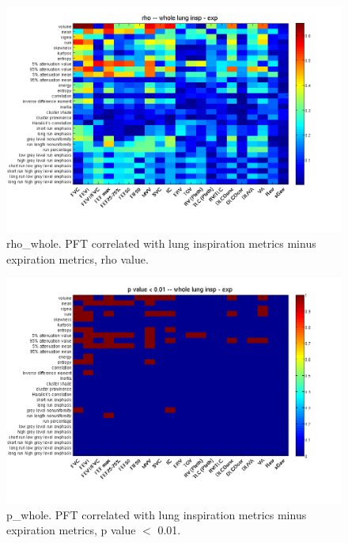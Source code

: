 \documentclass[12pt]{article}
\begin{document}
\begin{figure}
 \includegraphics[width=0.9\linewidth,viewport=100 60 620 520]{rho_whole.png}
 \caption{rho\_whole. PFT correlated with lung inspiration metrics minus expiration metrics, rho value.}
\end{figure}

\begin{figure}
 \includegraphics[width=0.9\linewidth,viewport=100 60 620 520]{p_whole.png}
 \caption{p\_whole. PFT correlated with lung inspiration metrics minus expiration metrics, p value $<$ 0.01.}
\end{figure}
\end{document}
